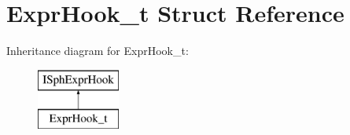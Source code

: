 \hypertarget{structExprHook__t}{\section{Expr\-Hook\-\_\-t Struct Reference}
\label{structExprHook__t}
}
Inheritance diagram for Expr\-Hook\-\_\-t\-:\begin{figure}[H]
\begin{center}
\leavevmode
\includegraphics[height=2.000000cm]{structExprHook__t}
\end{center}
\end{figure}
